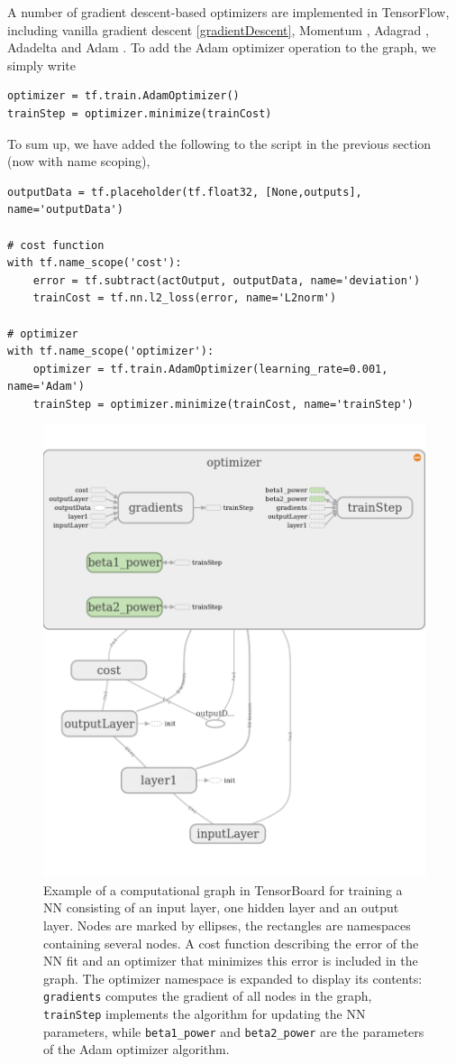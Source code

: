 \documentclass[twoside,english]{uiofysmaster}
\begin{document}
A number of gradient descent-based optimizers are implemented in TensorFlow, including
vanilla gradient descent \eqref{gradientDescent}, Momentum \cite{Qian99}, Adagrad \cite{Duchi11}, 
Adadelta \cite{Zeiler12} and Adam \cite{Kingma14}.
To add the Adam optimizer operation to the graph, we simply write
\begin{verbatim}
optimizer = tf.train.AdamOptimizer()
trainStep = optimizer.minimize(trainCost)
\end{verbatim}
To sum up, we have added the following to the script in the previous section (now with name scoping),
\begin{verbatim}
outputData = tf.placeholder(tf.float32, [None,outputs], name='outputData')

# cost function
with tf.name_scope('cost'):
    error = tf.subtract(actOutput, outputData, name='deviation')
    trainCost = tf.nn.l2_loss(error, name='L2norm')

# optimizer
with tf.name_scope('optimizer'):
    optimizer = tf.train.AdamOptimizer(learning_rate=0.001, name='Adam')
    trainStep = optimizer.minimize(trainCost, name='trainStep')
\end{verbatim}
\begin{figure}[h]
\centering
  \includegraphics[width=0.8\linewidth]{Figures/Implementation/tensorBoardTraining.pdf}
  \caption{Example of a computational graph in TensorBoard for training a NN consisting of an input layer, one 
	   hidden layer and an output layer. Nodes are marked by ellipses, the rectangles are namespaces
	   containing several nodes. A cost function describing the error of the NN fit and an optimizer that minimizes
	   this error is included in the graph. The optimizer namespace is expanded to display its contents:
	   \texttt{gradients} computes the gradient of all nodes in the graph, \texttt{trainStep} implements
	   the algorithm for updating the NN parameters, while \texttt{beta1\_power} and \texttt{beta2\_power}
	   are the parameters of the Adam optimizer algorithm.}
  \label{fig:tensorBoardTraining}
\end{figure}
\end{document}
